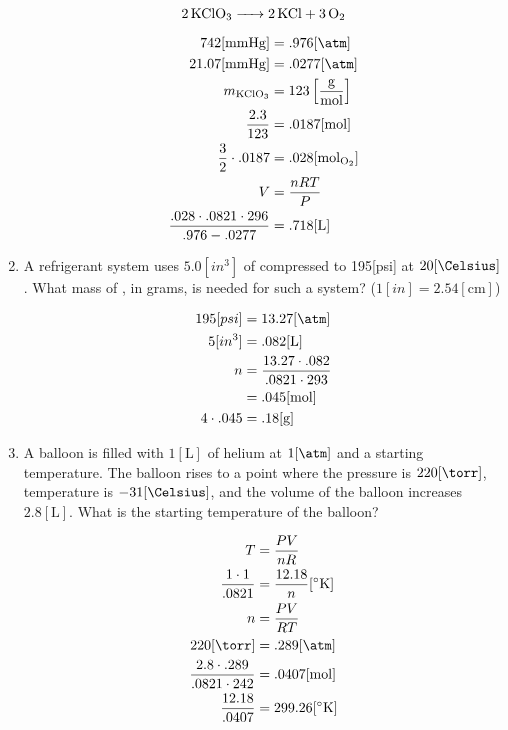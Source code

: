 \documentclass[12pt]{article}
\begin{document}
\begin{enumerate}
    \begin{equation}
      \ce{2KClO3 -> 2KCl + 3O2}
      \label{3}
    \end{equation}

    \begin{equation}
      \begin{split}
        742[\si{\mmHg}]&=.976[\si{\atm}]\\
        21.07[\si{\mmHg}]&=.0277[\si{\atm}]\\
        m_{\ce{KClO3}}&=123\left[ \frac{\si{\gram}}{\si{\mole}} \right]\\
        \frac{2.3}{123}&=.0187[\si{\mole}]\\
        \frac{3}{2}\cdot.0187&=.028[\si{\mole}_{\ce{O2}}]\\
        V&=\frac{nRT}{P}\\
        \frac{.028\cdot.0821\cdot296}{.976-.0277}&=.718[\si{\liter}]\\
      \end{split}
      \label{4}
    \end{equation}

  \item A refrigerant system uses $5.0[in^3]$ of  compressed to 195[psi] at $20[\si{\Celsius}]$. What mass of , in grams, is needed for such a system? ($1[in]=2.54[\si{\centi\meter}]$)

    \begin{equation}
      \begin{split}
        195[psi]&=13.27[\si{\atm}]\\
        5[in^3]&=.082[\si{\liter}]\\
        n&=\frac{13.27\cdot.082}{.0821\cdot293}\\
        &=.045[\si{\mole}]\\
        4\cdot.045&=.18[\si{\gram}]
      \end{split}
      \label{5}
    \end{equation}

  \item A balloon is filled with $1[\si{\liter}]$ of helium at $1[\si{\atm}]$ and a starting temperature. The balloon rises to a point where the pressure is $220[\si{\torr}]$, temperature is $-31[\si{\Celsius}]$, and the volume of the balloon increases $2.8[\si{\liter}]$. What is the starting temperature of the balloon?

    \begin{equation}
      \begin{split}
        T&=\frac{PV}{nR}\\
        \frac{1\cdot1}{.0821}&=\frac{12.18}{n}[^{\circ}\si{\kelvin}]\\
        n&=\frac{PV}{RT}\\
        220[\si{\torr}]&=.289[\si{\atm}]\\
        \frac{2.8\cdot.289}{.0821\cdot242}&=.0407[\si{\mole}]\\
        \frac{12.18}{.0407}&=299.26[^{\circ}\si{\kelvin}]
      \end{split}
      \label{6}
    \end{equation}


\end{enumerate}
\end{document}
